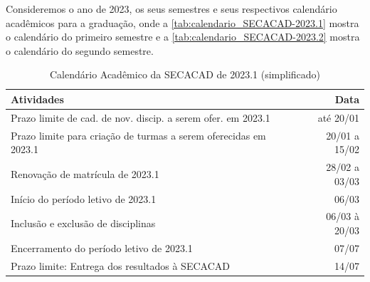 

Consideremos o ano de 2023, os seus semestres e seus respectivos calendário acadêmicos \cite{Calendario2023_1,Calendario2023_2} para a graduação, onde a \autoref{tab:calendario_SECACAD-2023.1} mostra o calendário do primeiro semestre e a \autoref{tab:calendario_SECACAD-2023.2} mostra o calendário do segundo semestre.

\begin{table}[H] \centering \caption{Calendário Acadêmico da SECACAD de 2023.1 (simplificado)} \label{tab:calendario_SECACAD-2023.1}
  \begin{tabular}{| l r |}
    \hline
    \textbf{Atividades}                                              & \textbf{Data} \\
    \hline
    Prazo limite de cad. de nov. discip. a serem ofer. em 2023.1     & até 20/01     \\
    Prazo limite para criação de turmas a serem oferecidas em 2023.1 & 20/01 a 15/02 \\
    Renovação de matrícula de 2023.1                                 & 28/02 a 03/03 \\
    Início do período letivo de 2023.1                               & 06/03         \\
    Inclusão e exclusão de disciplinas                               & 06/03 à 20/03 \\
    Encerramento do período letivo de 2023.1                         & 07/07         \\
    Prazo limite: Entrega dos resultados à SECACAD                   & 14/07         \\
    \hline
  \end{tabular}
\end{table}


